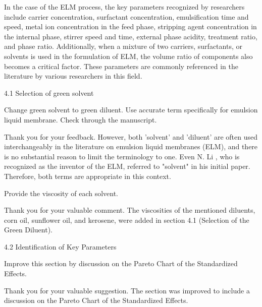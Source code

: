 \documentclass[11pt,answers]{exam}
\begin{document}
\begin{questions}
\begin{solutionorbox}
In the case of the ELM process, the key parameters recognized by researchers include carrier concentration, surfactant concentration, emulsification time and speed, metal ion concentration in the feed phase, stripping agent concentration in the internal phase, stirrer speed and time, external phase acidity, treatment ratio, and phase ratio. Additionally, when a mixture of two carriers, surfactants, or solvents is used in the formulation of ELM, the volume ratio of components also becomes a critical factor. These parameters are commonly referenced in the literature by various researchers in this field\cite{https://doi.org/10.1002/cjce.23418}\cite{KUMBASAR20122076}\cite{MA201788}\cite{SUJATHA2021108444}\cite{SULIMAN2023121261}\cite{ADMAWI2023101081}.


\end{solutionorbox}



4.1     Selection of green solvent

\question Change green solvent to green diluent. Use accurate term specifically for emulsion liquid membrane. Check through the manuscript. 

\begin{solutionorbox}

Thank you for your feedback. However, both 'solvent' and 'diluent' are often used interchangeably in the literature on emulsion liquid membranes (ELM)\cite{Raval2022-uo}\cite{kumar2019review}\cite{SUJATHA2021108444}, and there is no substantial reason to limit the terminology to one. Even N. Li \cite{li1971separation}, who is recognized as the inventor of the ELM, referred to "solvent" in his initial paper. Therefore, both terms are appropriate in this context.

\end{solutionorbox}

\question Provide the viscosity of each solvent.

\begin{solutionorbox}[5.5cm]
Thank you for your valuable comment. The viscosities of the mentioned diluents, corn oil, sunflower oil, and kerosene, were added in section 4.1 (Selection of the Green Diluent).
\end{solutionorbox}

4.2     Identification of Key Parameters

\question Improve this section by discussion on the Pareto Chart of the Standardized Effects. 

\begin{solutionorbox}
Thank you for your valuable suggestion. The section was improved to include a discussion on the Pareto Chart of the Standardized Effects. 
\end{solutionorbox}


\end{questions}
\end{document}
